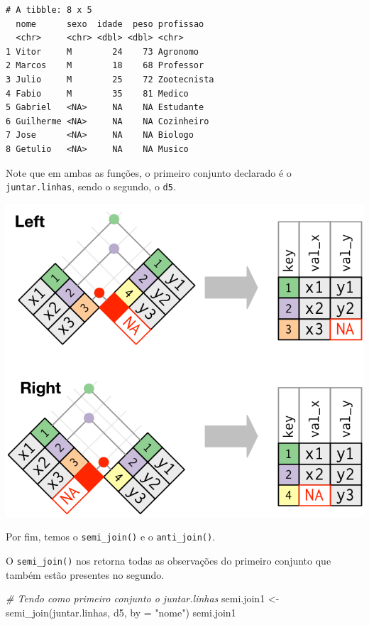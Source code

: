 \documentclass[
  brazilian,
]{book}
\newenvironment{Shaded}{\begin{snugshade}}{\end{snugshade}}
\newcommand{\AttributeTok}[1]{\textcolor[rgb]{0.77,0.63,0.00}{#1}}
\newcommand{\CommentTok}[1]{\textcolor[rgb]{0.56,0.35,0.01}{\textit{#1}}}
\newcommand{\FunctionTok}[1]{\textcolor[rgb]{0.00,0.00,0.00}{#1}}
\newcommand{\NormalTok}[1]{#1}
\newcommand{\OtherTok}[1]{\textcolor[rgb]{0.56,0.35,0.01}{#1}}
\newcommand{\StringTok}[1]{\textcolor[rgb]{0.31,0.60,0.02}{#1}}
\let\origfigure\figure
\let\endorigfigure\endfigure
\renewenvironment{figure}[1][2] {
    \expandafter\origfigure\expandafter[H]
} {
    \endorigfigure
}
\begin{document}
\begin{verbatim}
# A tibble: 8 x 5
  nome      sexo  idade  peso profissao  
  <chr>     <chr> <dbl> <dbl> <chr>      
1 Vitor     M        24    73 Agronomo   
2 Marcos    M        18    68 Professor  
3 Julio     M        25    72 Zootecnista
4 Fabio     M        35    81 Medico     
5 Gabriel   <NA>     NA    NA Estudante  
6 Guilherme <NA>     NA    NA Cozinheiro 
7 Jose      <NA>     NA    NA Biologo    
8 Getulio   <NA>     NA    NA Musico     
\end{verbatim}

Note que em ambas as funções, o primeiro conjunto declarado é o \texttt{juntar.linhas}, sendo o segundo, o \texttt{d5}.

\begin{figure}

{\centering \includegraphics[width=0.5\linewidth]{imagens/join-rl} 

}

\caption{Esquematização das funções $left_join$ e $right_join$. Fonte: R for Data Science, 2017.}\label{fig:unnamed-chunk-177}
\end{figure}

Por fim, temos o \texttt{semi\_join()} e o \texttt{anti\_join()}.

O \texttt{semi\_join()} nos retorna todas as observações do primeiro conjunto que também estão presentes no segundo.

\begin{Shaded}
\begin{Highlighting}[]
\CommentTok{\# Tendo como primeiro conjunto o \textasciigrave{}juntar.linhas\textasciigrave{}}
\NormalTok{semi.join1 }\OtherTok{\textless{}{-}} \FunctionTok{semi\_join}\NormalTok{(juntar.linhas, d5, }\AttributeTok{by =} \StringTok{"nome"}\NormalTok{)}
\NormalTok{semi.join1}
\end{Highlighting}
\end{Shaded}
\end{document}
